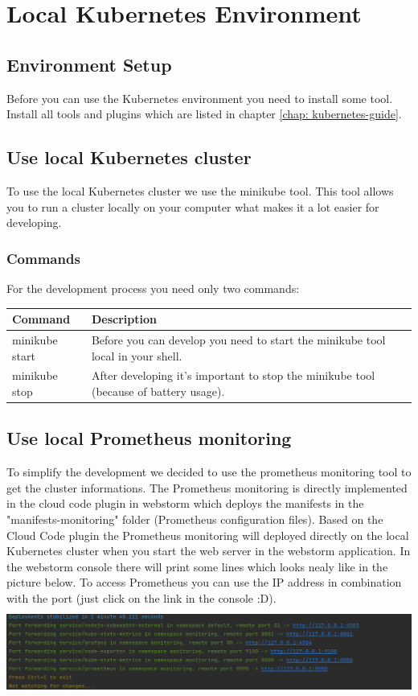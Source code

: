 \chapter{Local Kubernetes Environment}

\section{Environment Setup}
Before you can use the Kubernetes environment you need to install some tool. Install all tools and plugins which are listed in chapter \ref{chap: kubernetes-guide}. 

\section{Use local Kubernetes cluster}
To use the local Kubernetes cluster we use the minikube tool. This tool allows you to run a cluster locally on your computer what makes it a lot easier for developing.

\subsection{Commands}
For the development process you need only two commands: \newline
\begin{tabular}{m{3cm} m{11cm}}
    \textbf{Command} & \textbf{Description} \\
    \hline
    minikube start & Before you can develop you need to start the minikube tool local in your shell. \\
    minikube stop & After developing it's important to stop the minikube tool (because of battery usage). \\
\end{tabular}

\section{Use local Prometheus monitoring}
To simplify the development we decided to use the prometheus monitoring tool to get the cluster informations. The Prometheus monitoring is directly implemented in the cloud code plugin in webstorm which deploys the manifests in the "manifests-monitoring" folder (Prometheus configuration files).
Based on the Cloud Code plugin the Prometheus monitoring will deployed directly on the local Kubernetes cluster when you start the web server in the webstorm application. In the webstorm console there will print some lines which looks nealy like in the picture below. To access Prometheus you can use the IP address in combination with the port (just click on the link in the console :D). \newline
\includegraphics[height=3cm]{resources/prometheus_local_cluster.png}